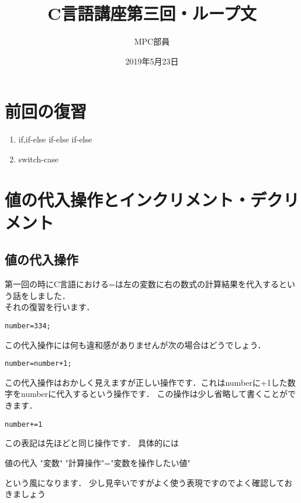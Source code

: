 \documentclass[a4j,titlepage,dvipdfmx]{jsarticle}   %
\title{C言語講座第三回・ループ文}
\author{MPC部員}
\date{2019年5月23日}
\newcommand{\articlepath}{./article}
\begin{document}
\maketitle

\section{前回の復習}
\begin{enumerate}
\item if,if-else if-else if-else
\item switch-case
\end{enumerate}
\section{値の代入操作とインクリメント・デクリメント}
\subsection{値の代入操作}
第一回の時にC言語における=は左の変数に右の数式の計算結果を代入するという話をしました．\\
それの復習を行います．
\begin{lstlisting}
number=334;
\end{lstlisting}
この代入操作には何も違和感がありませんが次の場合はどうでしょう．
\begin{lstlisting}
number=number+1;
\end{lstlisting}
この代入操作はおかしく見えますが正しい操作です．これはnumberに+1した数字をnumberに代入するという操作です．
この操作は少し省略して書くことができます．

\begin{lstlisting}
number+=1
\end{lstlisting}
この表記は先ほどと同じ操作です．
具体的には
\begin{itembox}{値の代入}
"変数" "計算操作"="変数を操作したい値"
\end{itembox}
という風になります．
少し見辛いですがよく使う表現ですのでよく確認しておきましょう
\end{document}
